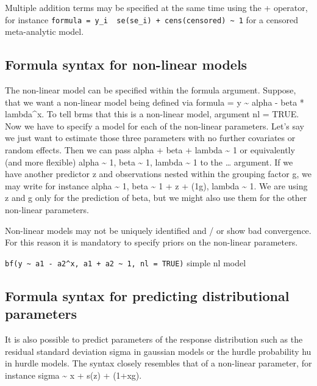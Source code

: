 \documentclass[]{book}
\begin{document}
Multiple addition terms may be specified at the same time using the + operator, for instance \texttt{formula\ =\ y\_i\ \textbar{}\ se(se\_i)\ +\ cens(censored)\ \textasciitilde{}\ 1} for a censored meta-analytic model.

\hypertarget{formula-syntax-for-non-linear-models}{%
\subsection{Formula syntax for non-linear models}\label{formula-syntax-for-non-linear-models}}

The non-linear model can be specified within the formula argument. Suppose, that we want a non-linear model being defined via formula = y \textasciitilde{} alpha - beta * lambda\^{}x. To tell brms that this is a non-linear model, argument nl = TRUE. Now we have to specify a model for each of the non-linear parameters. Let's say we just want to estimate those three parameters with no further covariates or random effects. Then we can pass alpha + beta + lambda \textasciitilde{} 1 or equivalently (and more flexible) alpha \textasciitilde{} 1, beta \textasciitilde{} 1, lambda \textasciitilde{} 1 to the \ldots{} argument. If we have another predictor z and observations nested within the grouping factor g, we may write for instance alpha \textasciitilde{} 1, beta \textasciitilde{} 1 + z + (1\textbar{}g), lambda \textasciitilde{} 1. We are using z and g only for the prediction of beta, but we might also use them for the other non-linear parameters.

Non-linear models may not be uniquely identified and / or show bad convergence. For this reason it is mandatory to specify priors on the non-linear parameters.

\texttt{bf(y\ \textasciitilde{}\ a1\ -\ a2\^{}x,\ a1\ +\ a2\ \textasciitilde{}\ 1,\ nl\ =\ TRUE)} simple nl model

\hypertarget{formula-syntax-for-predicting-distributional-parameters}{%
\subsection{Formula syntax for predicting distributional parameters}\label{formula-syntax-for-predicting-distributional-parameters}}

It is also possible to predict parameters of the response distribution such as the residual standard deviation sigma in gaussian models or the hurdle probability hu in hurdle models. The syntax closely resembles that of a non-linear parameter, for instance sigma \textasciitilde{} x + s(z) + (1+x\textbar{}g).
\end{document}
